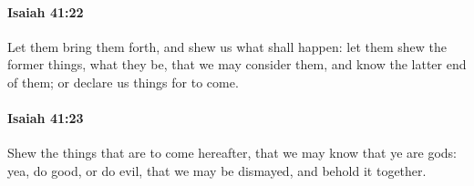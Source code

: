 		\paragraph{Isaiah 41:22} %
			\label{ISAIAH-41-22}

			Let them bring them forth, and shew us what shall happen: let them shew the former things, what they be, that we may consider them, and know the latter end of them; or declare us things for to come.


		\paragraph{Isaiah 41:23} %
			\label{ISAIAH-41-23}

			Shew the things that are to come hereafter, that we may know that ye are gods: yea, do good, or do evil, that we may be dismayed, and behold it together.


